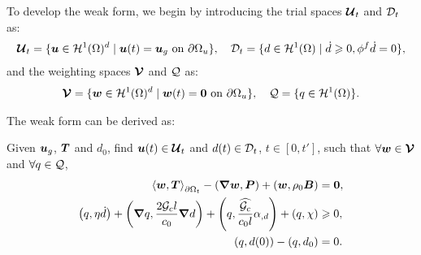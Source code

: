 To develop the weak form, we begin by introducing the trial spaces $\boldsymbol{\mathcal{U}}_t$ and $\mathcal{D}_t$ as:
\begin{align}
  \boldsymbol{\mathcal{U}}_t = \{ \boldsymbol{u} \in \mathcal{H}^1(\Omega)^d \mid \boldsymbol{u}(t) = \boldsymbol{u}_g \text{ on } {\partial \Omega}_u \}, \quad \mathcal{D}_t = \{ d \in \mathcal{H}^1(\Omega) \mid \dot{d} \geqslant 0, \phi^f \dot{d} = 0 \},
\end{align}
and the weighting spaces $\boldsymbol{\mathcal{V}}$ and $\mathcal{Q}$ as:
\begin{align}
  \boldsymbol{\mathcal{V}} = \{ \boldsymbol{w} \in \mathcal{H}^1(\Omega)^d \mid \boldsymbol{w}(t) = \boldsymbol{0} \text{ on } {\partial \Omega}_u \}, \quad \mathcal{Q} = \{ q \in \mathcal{H}^1(\Omega) \}.
\end{align}

The weak form can be derived as:
\begin{mdframed}[
    frametitle={The weak form},
    frametitlebackgroundcolor=gray!20,
    backgroundcolor=gray!5,
    linewidth=0pt,
    nobreak=true
  ]
  Given $\boldsymbol{u}_g$, $\boldsymbol{T}$ and $d_0$, find $\boldsymbol{u}(t) \in \boldsymbol{\mathcal{U}}_t$ and $d(t) \in \mathcal{D}_t$, $t \in [0, t']$, such that $\forall \boldsymbol{w} \in \boldsymbol{\mathcal{V}}$ and $\forall q \in \mathcal{Q}$,
  \begin{subequations}
    \begin{align}
      \left< \boldsymbol{w}, \boldsymbol{T} \right>_{{\partial \Omega}_t} - \left( \boldsymbol{\nabla} \boldsymbol{w}, \boldsymbol{P} \right) + \left( \boldsymbol{w}, \rho_0 \boldsymbol{B} \right)                                                             & = \boldsymbol{0},    \\
      \left( q, \eta \dot{d} \right) + \left( \boldsymbol{\nabla} q, \dfrac{2 {\mathcal{G}_c} l}{c_0} \boldsymbol{\nabla} d \right) + \left( q, \dfrac{\widehat{{\mathcal{G}_c}}}{c_0 l} \alpha_{, d} \right) + \left( q, \chi \right) & \geqslant 0, \\
      \left( q, d(0) \right) - \left( q, d_0 \right)                                                                                                                               & = 0.
    \end{align}
  \end{subequations}
\end{mdframed}

